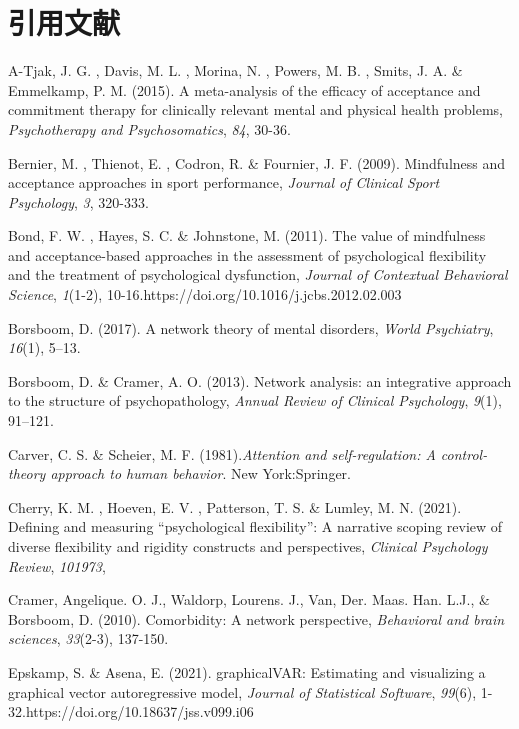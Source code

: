 \documentclass[12pt,a4paper,xelatex,ja=standard]{bxjsarticle}
\begin{document}
\clearpage

\hypertarget{ux5f15ux7528ux6587ux732e}{%
\section{引用文献}\label{ux5f15ux7528ux6587ux732e}}

\noindent \begingroup \setlength{\parindent}{-0.3in}
\setlength{\leftskip}{0.2in} \setlength{\parskip}{8pt}

A-Tjak, J. G. , Davis, M. L. , Morina, N. , Powers, M. B. , Smits, J. A.
\& Emmelkamp, P. M. (2015). A meta-analysis of the efficacy of
acceptance and commitment therapy for clinically relevant mental and
physical health problems, \emph{Psychotherapy and Psychosomatics},
\emph{84}, 30-36.

Bernier, M. , Thienot, E. , Codron, R. \& Fournier, J. F. (2009).
Mindfulness and acceptance approaches in sport performance,
\emph{Journal of Clinical Sport Psychology}, \emph{3}, 320-333.

Bond, F. W. , Hayes, S. C. \& Johnstone, M. (2011). The value of
mindfulness and acceptance-based approaches in the assessment of
psychological flexibility and the treatment of psychological
dysfunction, \emph{Journal of Contextual Behavioral Science},
\emph{1}(1-2), 10-16.https://doi.org/10.1016/j.jcbs.2012.02.003

Borsboom, D. (2017). A network theory of mental disorders,
\emph{World Psychiatry}, \emph{16}(1), 5--13.

Borsboom, D. \& Cramer, A. O. (2013). Network analysis: an integrative
approach to the structure of psychopathology,
\emph{Annual Review of Clinical Psychology}, \emph{9}(1), 91--121.

Carver, C. S. \& Scheier, M. F.
(1981).\emph{Attention and self-regulation: A control-theory approach to human behavior}.
New York:Springer.

Cherry, K. M. , Hoeven, E. V. , Patterson, T. S. \& Lumley, M. N.
(2021). Defining and measuring ``psychological flexibility'': A
narrative scoping review of diverse flexibility and rigidity constructs
and perspectives, \emph{Clinical Psychology Review}, \emph{101973},

Cramer, Ang\textquotesingle elique. O. J., Waldorp, Lourens. J., Van,
Der. Maas. Han. L.J., \& Borsboom, D. (2010). Comorbidity: A network
perspective, \emph{Behavioral and brain sciences}, \emph{33}(2-3),
137-150.

Epskamp, S. \& Asena, E. (2021). graphicalVAR: Estimating and
visualizing a graphical vector autoregressive model,
\emph{Journal of Statistical Software}, \emph{99}(6),
1-32.https://doi.org/10.18637/jss.v099.i06
\end{document}
